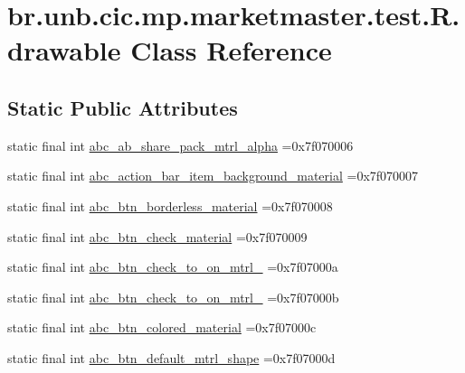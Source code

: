 \hypertarget{classbr_1_1unb_1_1cic_1_1mp_1_1marketmaster_1_1test_1_1R_1_1drawable}{}\section{br.\+unb.\+cic.\+mp.\+marketmaster.\+test.\+R.\+drawable Class Reference}
\label{classbr_1_1unb_1_1cic_1_1mp_1_1marketmaster_1_1test_1_1R_1_1drawable}
\subsection*{Static Public Attributes}
\begin{DoxyCompactItemize}
\item 
static final int \mbox{\hyperlink{classbr_1_1unb_1_1cic_1_1mp_1_1marketmaster_1_1test_1_1R_1_1drawable_a1d84ff85e6e55044c4a51fa621997c1a}{abc\+\_\+ab\+\_\+share\+\_\+pack\+\_\+mtrl\+\_\+alpha}} =0x7f070006
\item 
static final int \mbox{\hyperlink{classbr_1_1unb_1_1cic_1_1mp_1_1marketmaster_1_1test_1_1R_1_1drawable_a36a4505456f86bb3559aa84438857fd7}{abc\+\_\+action\+\_\+bar\+\_\+item\+\_\+background\+\_\+material}} =0x7f070007
\item 
static final int \mbox{\hyperlink{classbr_1_1unb_1_1cic_1_1mp_1_1marketmaster_1_1test_1_1R_1_1drawable_a6daa61ee2dad4bb3997c80f54233ed97}{abc\+\_\+btn\+\_\+borderless\+\_\+material}} =0x7f070008
\item 
static final int \mbox{\hyperlink{classbr_1_1unb_1_1cic_1_1mp_1_1marketmaster_1_1test_1_1R_1_1drawable_ac54fb496c1041d0d4ad4a34cdf176a25}{abc\+\_\+btn\+\_\+check\+\_\+material}} =0x7f070009
\item 
static final int \mbox{\hyperlink{classbr_1_1unb_1_1cic_1_1mp_1_1marketmaster_1_1test_1_1R_1_1drawable_a8f1dfd52d80ab630f51ae991592c66c7}{abc\+\_\+btn\+\_\+check\+\_\+to\+\_\+on\+\_\+mtrl\+\_}} =0x7f07000a
\item 
static final int \mbox{\hyperlink{classbr_1_1unb_1_1cic_1_1mp_1_1marketmaster_1_1test_1_1R_1_1drawable_ad0285d3261d31c5ba7dbf2da3bab8c90}{abc\+\_\+btn\+\_\+check\+\_\+to\+\_\+on\+\_\+mtrl\+\_}} =0x7f07000b
\item 
static final int \mbox{\hyperlink{classbr_1_1unb_1_1cic_1_1mp_1_1marketmaster_1_1test_1_1R_1_1drawable_af577aa7bbcdc7591ee2691c0b13dc655}{abc\+\_\+btn\+\_\+colored\+\_\+material}} =0x7f07000c
\item 
static final int \mbox{\hyperlink{classbr_1_1unb_1_1cic_1_1mp_1_1marketmaster_1_1test_1_1R_1_1drawable_a8959eb4a14fc032cc014653fa76712e7}{abc\+\_\+btn\+\_\+default\+\_\+mtrl\+\_\+shape}} =0x7f07000d

\end{DoxyCompactItemize}
